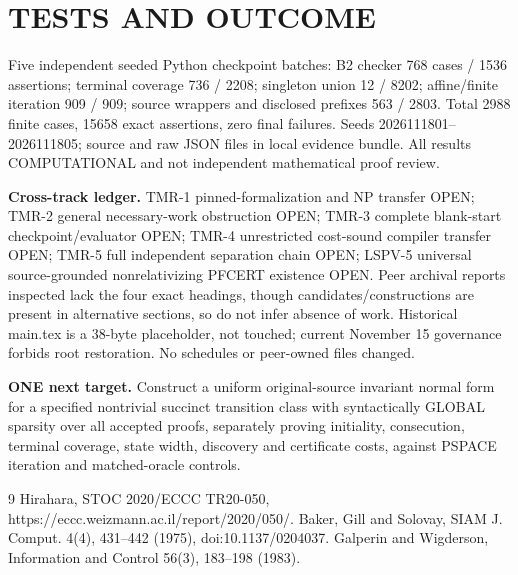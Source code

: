 \documentclass[11pt]{article}
\begin{document}
\section{TESTS AND OUTCOME}
Five independent seeded Python checkpoint batches: B2 checker 768 cases / 1536 assertions; terminal coverage 736 / 2208; singleton union 12 / 8202; affine/finite iteration 909 / 909; source wrappers and disclosed prefixes 563 / 2803. Total 2988 finite cases, 15658 exact assertions, zero final failures. Seeds 2026111801--2026111805; source and raw JSON files in local evidence bundle. All results COMPUTATIONAL and not independent mathematical proof review.
\par\textbf{Cross-track ledger.} TMR-1 pinned-formalization and NP transfer OPEN; TMR-2 general necessary-work obstruction OPEN; TMR-3 complete blank-start checkpoint/evaluator OPEN; TMR-4 unrestricted cost-sound compiler transfer OPEN; TMR-5 full independent separation chain OPEN; LSPV-5 universal source-grounded nonrelativizing PFCERT existence OPEN. Peer archival reports inspected lack the four exact headings, though candidates/constructions are present in alternative sections, so do not infer absence of work. Historical main.tex is a 38-byte placeholder, not touched; current November 15 governance forbids root restoration. No schedules or peer-owned files changed.
\par\textbf{ONE next target.} Construct a uniform original-source invariant normal form for a specified nontrivial succinct transition class with syntactically GLOBAL sparsity over all accepted proofs, separately proving initiality, consecution, terminal coverage, state width, discovery and certificate costs, against PSPACE iteration and matched-oracle controls.
\begin{thebibliography}{9}
 Hirahara, STOC 2020/ECCC TR20-050, https://eccc.weizmann.ac.il/report/2020/050/.
 Baker, Gill and Solovay, SIAM J. Comput. 4(4), 431--442 (1975), doi:10.1137/0204037.
 Galperin and Wigderson, Information and Control 56(3), 183--198 (1983).
\end{thebibliography}
\end{document}
